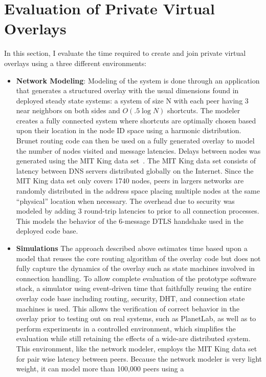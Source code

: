 \section{Evaluation of Private Virtual Overlays}
In this section, I evaluate the time required to create and join private virtual
overlays using a three different environments:

\begin{itemize}
\item \textbf{Network Modeling}: Modeling of the system is done through an
application that generates a structured overlay with the usual dimensions found
in deployed steady state systems: a system of size N with each peer having 3
near neighbors on both sides and $O(.5\log N)$ shortcuts.  The modeler creates a
fully connected system where shortcuts are optimally chosen based upon their
location in the node ID space using a harmonic distribution.  Brunet routing
code can then be used on a fully generated overlay to model the number of
nodes visited and message latencies.  Delays between nodes was generated using
the MIT King data set~\cite{king_data}.  The MIT King data set consists of
latency between DNS servers distributed globally on the Internet.  Since the
MIT King data set only covers 1740 nodes, peers in largers networks are
randomly distributed in the address space placing multiple nodes at the same
``physical'' location when necessary. The overhead due to security was modeled
by adding 3 round-trip latencies to prior to all connection processes. This
models the behavior of the 6-message DTLS handshake used in the deployed code
base.
\item \textbf{Simulations} The approach described above estimates time based
upon a model that reuses the core routing algorithm of the overlay code but
does not fully capture the dynamics of the overlay such as state machines
involved in connection handling.  To allow complete evaluation of the prototype
software stack, a simulator using event-driven time that faithfully reusing the
entire overlay code base including routing, security, DHT, and connection state
machines is used.  This allows the verification of correct behavior in the
overlay prior to testing out on real systems, such as PlanetLab, as well as to
perform experiments in a controlled environment, which simplifies the
evaluation while still retaining the effects of a wide-are distributed system.
This environment, like the network modeler, employs the MIT King data
set~\cite{king_data} for pair wise latency between peers.  Because the network
modeler is very light weight, it can model more than 100,000 peers using a

\end{itemize}

